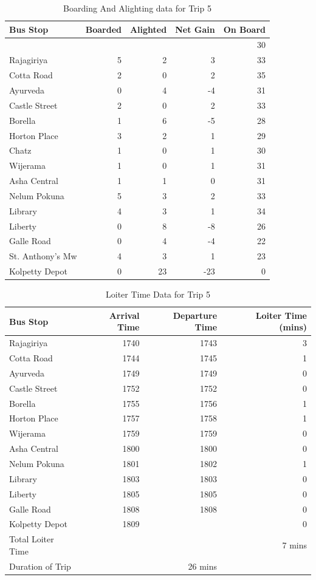 \documentclass[12pt, oneside]{report}
\begin{document}
\begin{table}
\centering
\begin{tabular}{|l|r|r|r|r|}
\hline
Bus Stop & Boarded & Alighted & Net Gain & On Board \\
\hline
 & & & & 30 \\
Rajagiriya	&5	&2	&3	&33\\
Cotta Road	&2	&0	&2	&35\\
Ayurveda	&0	&4	&-4	&31\\
Castle Street	&2	&0	&2	&33\\
Borella	&1	&6	&-5	&28\\
Horton Place	&3	&2	&1	&29\\
\rowcolor[gray]{0.7}
Chatz	&1	&0	&1	&30\\
Wijerama	&1	&0	&1	&31\\
Asha Central	&1	&1	&0	&31\\
Nelum Pokuna	&5	&3	&2	&33\\
Library	&4	&3	&1	&34\\
Liberty	&0	&8	&-8	&26\\
Galle Road	&0	&4	&-4	&22\\
\rowcolor[gray]{0.7}
St. Anthony's Mw	&4	&3	&1	&23\\
Kolpetty Depot	&0	&23	&-23	&0\\
\hline
\end{tabular}
\caption{Boarding And Alighting data for Trip 5}
\label{table-trip5-BoardingAndAlighting}
\end{table}

\begin{table}
\centering
\begin{tabular}{|l|r|r|r|}
\hline
Bus Stop & Arrival Time & Departure Time & Loiter Time (mins) \\
\hline
Rajagiriya	&1740	&1743	&3\\
Cotta Road	&1744	&1745	&1\\
Ayurveda	&1749	&1749	&0\\
Castle Street	&1752	&1752	&0\\
Borella	&1755	&1756	&1\\
Horton Place	&1757	&1758	&1\\
Wijerama	&1759	&1759	&0\\
Asha Central	&1800	&1800	&0\\
Nelum Pokuna	&1801	&1802	&1\\
Library	&1803	&1803	&0\\
Liberty	&1805	&1805	&0\\
Galle Road	&1808	&1808	&0\\
Kolpetty Depot	&1809	&	&0\\
\hline
Total Loiter Time & & & 7 mins \\
Duration of Trip & & 26 mins & \\
\hline
\end{tabular}
\caption{Loiter Time Data for Trip 5}
\label{table-trip5-LoiterTime}
\end{table}



\end{document}
